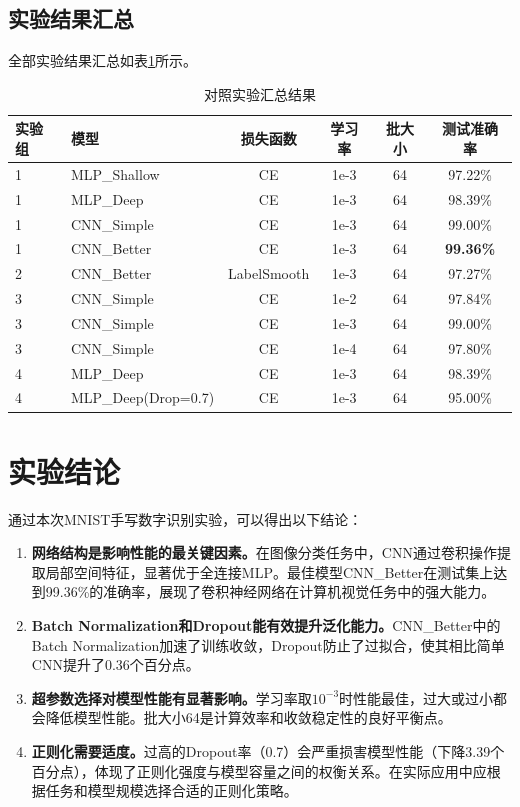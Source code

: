 \documentclass[12pt,a4paper]{ctexart}
\begin{document}
\subsection{实验结果汇总}
全部实验结果汇总如表\ref{tab:summary}所示。

\begin{table}[H]
\centering
\caption{对照实验汇总结果}
\label{tab:summary}
\vspace{0.2cm}
\begin{tabular}{llcccc}
\toprule
\textbf{实验组} & \textbf{模型} & \textbf{损失函数} & \textbf{学习率} & \textbf{批大小} & \textbf{测试准确率} \\
\midrule
1 & MLP\_Shallow & CE & 1e-3 & 64 & 97.22\% \\
1 & MLP\_Deep & CE & 1e-3 & 64 & 98.39\% \\
1 & CNN\_Simple & CE & 1e-3 & 64 & 99.00\% \\
1 & CNN\_Better & CE & 1e-3 & 64 & \textbf{99.36\%} \\
\midrule
2 & CNN\_Better & LabelSmooth & 1e-3 & 64 & 97.27\% \\
\midrule
3 & CNN\_Simple & CE & 1e-2 & 64 & 97.84\% \\
3 & CNN\_Simple & CE & 1e-3 & 64 & 99.00\% \\
3 & CNN\_Simple & CE & 1e-4 & 64 & 97.80\% \\
\midrule
4 & MLP\_Deep & CE & 1e-3 & 64 & 98.39\% \\
4 & MLP\_Deep(Drop=0.7) & CE & 1e-3 & 64 & 95.00\% \\
\bottomrule
\end{tabular}
\end{table}

\section{实验结论}

通过本次MNIST手写数字识别实验，可以得出以下结论：

\begin{enumerate}
  \item \textbf{网络结构是影响性能的最关键因素。}在图像分类任务中，CNN通过卷积操作提取局部空间特征，显著优于全连接MLP。最佳模型CNN\_Better在测试集上达到99.36\%的准确率，展现了卷积神经网络在计算机视觉任务中的强大能力。

  \item \textbf{Batch Normalization和Dropout能有效提升泛化能力。}CNN\_Better中的Batch Normalization加速了训练收敛，Dropout防止了过拟合，使其相比简单CNN提升了0.36个百分点。

  \item \textbf{超参数选择对模型性能有显著影响。}学习率取$10^{-3}$时性能最佳，过大或过小都会降低模型性能。批大小64是计算效率和收敛稳定性的良好平衡点。

  \item \textbf{正则化需要适度。}过高的Dropout率（0.7）会严重损害模型性能（下降3.39个百分点），体现了正则化强度与模型容量之间的权衡关系。在实际应用中应根据任务和模型规模选择合适的正则化策略。
\end{enumerate}
\end{document}

